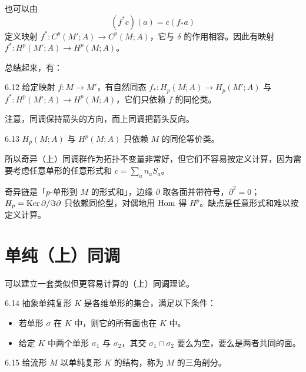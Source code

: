 也可以由
\begin{equation}
  (f^*c)(a)=c(f_*a)
  \tag{6.9}
\end{equation}
定义映射 $f^*:C^p(M';A)\to C^p(M;A)$，它与 $\delta$ 的作用相容。因此有映射 $f^*:H^p(M';A)\to H^p(M;A)$。

总结起来，有：

\begin{proposition}{6.12}
  给定映射 $f:M\to M'$，有自然同态 $f_*:H_p(M;A)\to H_p(M';A)$ 与 $f^*:H^p(M';A)\to H^p(M;A)$，它们只依赖 $f$ 的同伦类。
\end{proposition}

注意，同调保持箭头的方向，而上同调把箭头反向。

\begin{corollary}{6.13}
  $H_p(M;A)$ 与 $H^p(M;A)$ 只依赖 $M$ 的同伦等价类。
\end{corollary}

所以奇异（上）同调群作为拓扑不变量非常好，但它们不容易按定义计算，因为需要考虑任意单形的任意形式和 $c=\sum_an_aS_a$。


奇异链是「$p$-单形到 $M$ 的形式和」，边缘 $\partial$ 取各面并带符号，$\partial^2=0$；$H_p=\operatorname{Ker}\partial/\Im\partial$ 只依赖同伦型，对偶地用 $\operatorname{Hom}$ 得 $H^p$。缺点是任意形式和难以按定义计算。

\section{单纯（上）同调}

可以建立一套类似但更容易计算的（上）同调理论。

\begin{definition}{6.14}
  抽象单纯复形 $K$ 是各维单形的集合，满足以下条件：
  \begin{itemize}
    \item 若单形 $\sigma$ 在 $K$ 中，则它的所有面也在 $K$ 中。
    \item 给定 $K$ 中两个单形 $\sigma_1$ 与 $\sigma_2$，其交 $\sigma_1\cap\sigma_2$ 要么为空，要么是两者共同的面。
  \end{itemize}
\end{definition}

\begin{definition}{6.15}
  给流形 $M$ 以单纯复形 $K$ 的结构，称为 $M$ 的三角剖分。
\end{definition}

